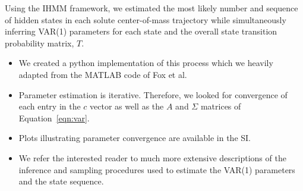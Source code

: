 \documentclass{article}
\begin{document}
  Using the IHMM framework, we estimated the most likely number and sequence of hidden
  states in each solute center-of-mass trajectory while simultaneously inferring VAR(1)
  parameters for each state and the overall state transition probability matrix, $T$.
  \begin{itemize}
    \item We created a python implementation of this process which we heavily adapted from
    the MATLAB code of Fox et al.~\cite{fox_sticky_2007} 
    \item Parameter estimation is iterative. Therefore, we looked for convergence 
    of each entry in the $c$ vector as well as the $A$ and $\Sigma$ matrices of 
    Equation~\ref{eqn:var}.
    \item Plots illustrating parameter convergence are available in the SI.
    \item We refer the interested reader to much more extensive descriptions of 
    the inference and sampling procedures used to estimate the VAR(1) parameters
    and the state sequence. 
    ~\cite{beal_infinite_2002,teh_hierarchical_2006,van_gael_beam_2008,fox_nonparametric_2009,fox_bayesian_2010}
  \end{itemize}
  
\end{document}
